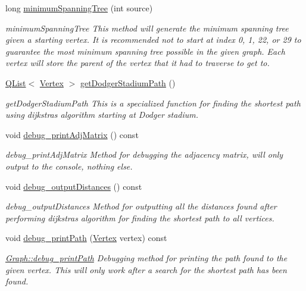 \begin{DoxyCompactItemize}
long \hyperlink{class_graph_ab3c693e0fce0a24e32893b750b0ca82f}{minimum\+Spanning\+Tree} (int source)
\begin{DoxyCompactList}\small\item\em minimum\+Spanning\+Tree This method will generate the minimum spanning tree given a starting vertex. It is recommended not to start at index 0, 1, 22, or 29 to guarantee the most minimum spanning tree possible in the given graph. Each vertex will store the parent of the vertex that it had to traverse to get to. \end{DoxyCompactList}\item 
\hyperlink{class_q_list}{Q\+List}$<$ \hyperlink{class_vertex}{Vertex} $>$ \hyperlink{class_graph_a2a404d20921b9f68e9d31baeb7079293}{get\+Dodger\+Stadium\+Path} ()
\begin{DoxyCompactList}\small\item\em get\+Dodger\+Stadium\+Path This is a specialized function for finding the shortest path using dijkstra\textquotesingle{}s algorithm starting at Dodger stadium. \end{DoxyCompactList}\item 
void \hyperlink{class_graph_a6bb74d3d522a6a788296839481278f48}{debug\+\_\+print\+Adj\+Matrix} () const 
\begin{DoxyCompactList}\small\item\em debug\+\_\+print\+Adj\+Matrix Method for debugging the adjacency matrix, will only output to the console, nothing else. \end{DoxyCompactList}\item 
void \hyperlink{class_graph_a7e75b59c73495734103b055e70a561bb}{debug\+\_\+output\+Distances} () const 
\begin{DoxyCompactList}\small\item\em debug\+\_\+output\+Distances Method for outputting all the distances found after performing dijkstra\textquotesingle{}s algorithm for finding the shortest path to all vertices. \end{DoxyCompactList}\item 
void \hyperlink{class_graph_abd2cdd5f963d7f820de8d2b0e6f37685}{debug\+\_\+print\+Path} (\hyperlink{class_vertex}{Vertex} vertex) const 
\begin{DoxyCompactList}\small\item\em \hyperlink{class_graph_abd2cdd5f963d7f820de8d2b0e6f37685}{Graph\+::debug\+\_\+print\+Path} Debugging method for printing the path found to the given vertex. This will only work after a search for the shortest path has been found. \end{DoxyCompactList}\item 

\end{DoxyCompactItemize}
